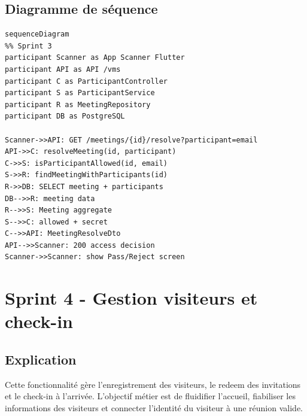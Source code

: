 \documentclass[12pt,a4paper]{article}
\begin{document}
\subsection*{Diagramme de séquence}
\begin{verbatim}
sequenceDiagram
%% Sprint 3
participant Scanner as App Scanner Flutter
participant API as API /vms
participant C as ParticipantController
participant S as ParticipantService
participant R as MeetingRepository
participant DB as PostgreSQL

Scanner->>API: GET /meetings/{id}/resolve?participant=email
API->>C: resolveMeeting(id, participant)
C->>S: isParticipantAllowed(id, email)
S->>R: findMeetingWithParticipants(id)
R->>DB: SELECT meeting + participants
DB-->>R: meeting data
R-->>S: Meeting aggregate
S-->>C: allowed + secret
C-->>API: MeetingResolveDto
API-->>Scanner: 200 access decision
Scanner->>Scanner: show Pass/Reject screen
\end{verbatim}

\section*{Sprint 4 - Gestion visiteurs et check-in}
\subsection*{Explication}
Cette fonctionnalité gère l’enregistrement des visiteurs, le redeem des invitations et le check-in à l’arrivée. L’objectif métier est de fluidifier l’accueil, fiabiliser les informations des visiteurs et connecter l’identité du visiteur à une réunion valide.
\end{document}
